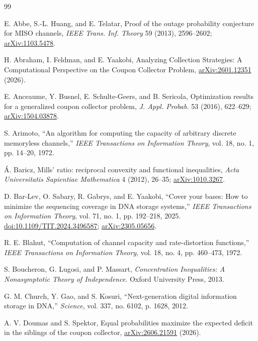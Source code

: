 \documentclass[11pt]{article}
\theoremstyle{definition}
\theoremstyle{remark}
\newcommand{\1}{\mathbf 1}
\begin{document}
\begin{thebibliography}{99}\raggedright

 E. Abbe, S.-L. Huang, and E. Telatar,
Proof of the outage probability conjecture for MISO channels,
\emph{IEEE Trans. Inf. Theory} 59 (2013), 2596--2602;
\href{https://arxiv.org/abs/1103.5478}{arXiv:1103.5478}.

 H. Abraham, I. Feldman, and E. Yaakobi,
Analyzing Collection Strategies: A Computational Perspective on the Coupon Collector Problem,
\href{https://arxiv.org/abs/2601.12351}{arXiv:2601.12351} (2026).

 E. Anceaume, Y. Busnel, E. Schulte-Geers, and B. Sericola,
Optimization results for a generalized coupon collector problem,
\emph{J. Appl. Probab.} 53 (2016), 622--629;
\href{https://arxiv.org/abs/1504.03878}{arXiv:1504.03878}.

S. Arimoto,
``An algorithm for computing the capacity of arbitrary discrete memoryless channels,''
\emph{IEEE Transactions on Information Theory}, vol. 18, no. 1, pp. 14--20, 1972.

 \'A. Baricz,
Mills' ratio: reciprocal convexity and functional inequalities,
\emph{Acta Universitatis Sapientiae Mathematica} 4 (2012), 26--35;
\href{https://arxiv.org/abs/1010.3267}{arXiv:1010.3267}.

D. Bar-Lev, O. Sabary, R. Gabrys, and E. Yaakobi,
``Cover your bases: How to minimize the sequencing coverage in DNA storage systems,''
\emph{IEEE Transactions on Information Theory}, vol. 71, no. 1, pp. 192--218, 2025.
\href{https://doi.org/10.1109/TIT.2024.3496587}{doi:10.1109/TIT.2024.3496587};
\href{https://arxiv.org/abs/2305.05656}{arXiv:2305.05656}.

R. E. Blahut,
``Computation of channel capacity and rate-distortion functions,''
\emph{IEEE Transactions on Information Theory}, vol. 18, no. 4, pp. 460--473, 1972.

S. Boucheron, G. Lugosi, and P. Massart,
\emph{Concentration Inequalities: A Nonasymptotic Theory of Independence}.
Oxford University Press, 2013.

G. M. Church, Y. Gao, and S. Kosuri,
``Next-generation digital information storage in DNA,''
\emph{Science}, vol. 337, no. 6102, p. 1628, 2012.

 A. V. Doumas and S. Spektor,
Equal probabilities maximize the expected deficit in the siblings of the coupon collector,
\href{https://arxiv.org/abs/2606.21591}{arXiv:2606.21591} (2026).


\end{thebibliography}
\end{document}
